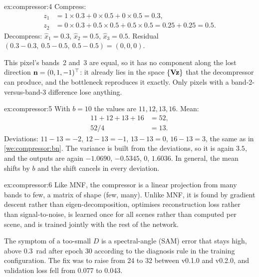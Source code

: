 \begin{solution}{ex:compressor:4}
Compress:
\begin{align*}
z_1 &= 1\times0.3 + 0\times0.5 + 0\times0.5 = 0.3,\\
z_2 &= 0\times0.3 + 0.5\times0.5 + 0.5\times0.5 = 0.25 + 0.25 = 0.5.
\end{align*}
Decompress: $\hat{x}_1 = 0.3$, $\hat{x}_2 = 0.5$, $\hat{x}_3 = 0.5$. Residual
$(0.3-0.3,\ 0.5-0.5,\ 0.5-0.5) = (0, 0, 0)$.

This pixel's bands~2 and~3 are equal, so it has no component along the lost direction
$\mathbf{n} = (0, 1, -1)^{\top}$: it already lies in the space $\{\mathbf{V}\mathbf{z}\}$ that the decompressor can
produce, and the bottleneck reproduces it exactly. Only pixels with a band-2-versus-band-3 difference
lose anything.
\end{solution}

\begin{solution}{ex:compressor:5}
With $b = 10$ the values are $11, 12, 13, 16$. Mean:
\begin{align*}
11 + 12 + 13 + 16 &= 52,\\
52/4 &= 13.
\end{align*}
Deviations: $11-13 = -2$, $12-13=-1$, $13-13 = 0$, $16-13 = 3$, the same as in
\cref{we:compressor:bn}. The variance is built from the deviations, so it is again $3.5$, and the
outputs are again $-1.0690$, $-0.5345$, $0$, $1.6036$. In general, the mean shifts by $b$ and the
shift cancels in every deviation.
\end{solution}

\begin{solution}{ex:compressor:6}
Like MNF, the compressor is a linear projection from many bands to few, a matrix of shape (few, many).
Unlike MNF, it is found by gradient descent rather than eigen-decomposition, optimises reconstruction
loss rather than signal-to-noise, is learned once for all scenes rather than computed per scene, and is
trained jointly with the rest of the network.

The symptom of a too-small $D$ is a spectral-angle (SAM) error that stays high, above 0.3~rad after
epoch 30 according to the diagnosis rule in the training configuration. The fix was to raise
 from 24 to 32 between v0.1.0 and v0.2.0, and validation loss fell from 0.077
to 0.043.
\end{solution}
